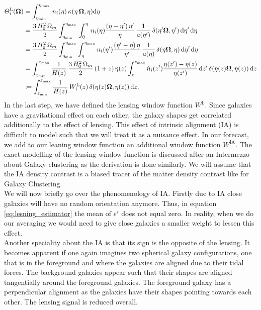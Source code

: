 \documentclass[../main.tex]{subfiles}
\begin{document}
\begin{align}
\varTheta_i^\mathrm{L}(\boldsymbol{\Omega})&= \int_{\eta_\mathrm{min}}^{\eta_\mathrm{max}} \, n_i(\eta)\,\kappa(\eta\,\boldsymbol{\Omega},\eta) \mathrm{d}\eta \\
&=  \frac{3\,H_0^2\,\Omega_m}{2} \int_{\eta_\mathrm{min}}^{\eta_\mathrm{max}}  \,\int_0^\eta \, n_i(\eta) \frac{(\eta-\eta')\,\eta'}{\eta}\,\frac{1}{a(\eta')}\,\delta(\eta'\boldsymbol{\Omega},\eta') \,\mathrm{d}\eta' \, \mathrm{d}\eta \nonumber \\
&= \frac{3\,H_0^2\,\Omega_m}{2} \int_{\eta_\mathrm{min}}^{\eta_\mathrm{max}} \int_{\eta}^{\eta_\mathrm{max}} n_i(\eta') \frac{(\eta'-\eta)\,\eta}{\eta'}\,\frac{1}{a(\eta)}\,\delta(\eta\boldsymbol{\Omega},\eta) \,\mathrm{d}\eta' \, \mathrm{d}\eta \nonumber\\
&= \int_{z_\mathrm{min}}^{z_\mathrm{max}} \frac{1}{H(z)}\,\frac{3\,H_0^2\,\Omega_m}{2}\, (1+z)\,\eta(z) \int_z^{z_\mathrm{max}} \hat{n}_i(z') \frac{\eta(z')-\eta(z)}{\eta(z')} \,\mathrm{d} z' \,\delta(\eta(z)\boldsymbol{\Omega},\eta(z)) \,\mathrm{d} z \nonumber \\
\label{eq:lensing_observable}&\coloneqq \int_{z_\mathrm{min}}^{z_\mathrm{max}} \frac{1}{H(z)}\, W_i^\mathrm{L}(z) \,\delta(\eta(z)\boldsymbol{\Omega},\eta(z)) \,\mathrm{d} z. 
\end{align} 
In the last step, we have defined the lensing window function $W^\mathrm{L}$. Since galaxies have a gravitational effect on each other, the galaxy shapes get correlated additionally to the effect of lensing. This effect of intrinsic alignment (IA) is difficult to model such that we will treat it as a nuisance effect. In our forecast, we add to our leaning window function an additional window function $W^\mathrm{IA}$. The exact modelling of the lensing window function is discussed after an Intermezzo about Galaxy clustering as the derivation is done similarly. We will assume that the IA density contrast is a biased tracer of the matter density contrast like for Galaxy Clustering.\\
We will now briefly go over the phenomenology of IA. Firstly due to IA close galaxies will have no random orientation anymore. Thus, in equation \ref{eq:lesning_estimator} the mean of $\epsilon^s$ does not equal zero. In reality, when we do our averaging we would need to give close galaxies a smaller weight to lessen this effect.\\
Another speciality about the IA is that its sign is the opposite of the lensing. It becomes apparent if one again imagines two spherical galaxy configurations, one that is in the foreground and where the galaxies are aligned due to their tidal forces. The background galaxies appear such that their shapes are aligned tangentially around the foreground galaxies. The foreground galaxy has a perpendicular alignment as the galaxies have their shapes pointing towards each other. The lensing signal is reduced overall.\\
\end{document}
